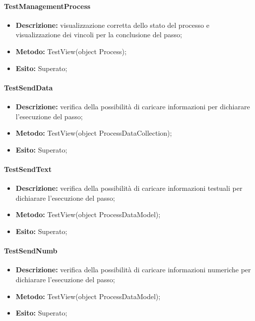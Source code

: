 \paragraph{TestManagementProcess}
\begin{itemize}
\item \textbf{Descrizione:} visualizzazione corretta dello stato del processo e visualizzazione dei vincoli per la conclusione del passo;
\item \textbf{Metodo:} TestView(object Process);
\item \textbf{Esito:} Superato;
\end{itemize}

\paragraph{TestSendData}
\begin{itemize}
\item \textbf{Descrizione:} verifica della possibilità di caricare informazioni per dichiarare l'esecuzione del passo;
\item \textbf{Metodo:} TestView(object ProcessDataCollection);
\item \textbf{Esito:} Superato;
\end{itemize}

\paragraph{TestSendText}
\begin{itemize}
\item \textbf{Descrizione:} verifica della possibilità di caricare informazioni testuali per dichiarare l'esecuzione del passo;
\item \textbf{Metodo:} TestView(object ProcessDataModel);
\item \textbf{Esito:} Superato;
\end{itemize}

\paragraph{TestSendNumb}
\begin{itemize}
\item \textbf{Descrizione:} verifica della possibilità di caricare informazioni numeriche per dichiarare l'esecuzione del passo;
\item \textbf{Metodo:} TestView(object ProcessDataModel);
\item \textbf{Esito:} Superato;
\end{itemize}

